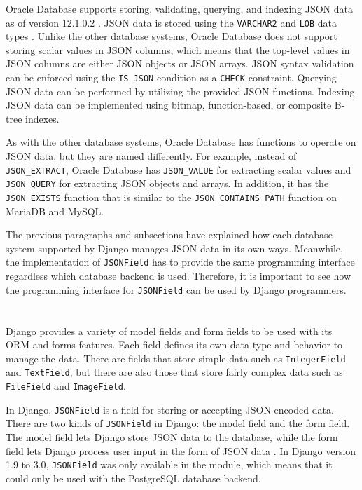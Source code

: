 Oracle Database supports storing, validating, querying, and indexing JSON data
as of version 12.1.0.2 \cite{oracle:12.1.0.2}. JSON data is stored using the
\verb|VARCHAR2| and \verb|LOB| data types \cite{oracle:json}. Unlike the other
database systems, Oracle Database does not support storing scalar values in
JSON columns, which means that the top-level values in JSON columns are either
JSON objects or JSON arrays. JSON syntax validation can be enforced using the
\verb|IS JSON| condition as a \verb|CHECK| constraint. Querying JSON data can
be performed by utilizing the provided JSON functions. Indexing JSON data can
be implemented using bitmap, function-based, or composite B-tree indexes.

As with the other database systems, Oracle Database has functions to operate on
JSON data, but they are named differently. For example, instead of
\verb|JSON_EXTRACT|, Oracle Database has \verb|JSON_VALUE| for extracting
scalar values and \verb|JSON_QUERY| for extracting JSON objects and arrays. In
addition, it has the \verb|JSON_EXISTS| function that is similar to the
\verb|JSON_CONTAINS_PATH| function on MariaDB and MySQL.

The previous paragraphs and subsections have explained how each database
system supported by Django manages JSON data in its own ways. Meanwhile, the
implementation of \verb|JSONField| has to provide the same programming
interface regardless which database backend is used. Therefore, it is important
to see how the programming interface for \verb|JSONField| can be used by Django
programmers.

\section{}

Django provides a variety of model fields and form fields to be used with its
ORM and forms features. Each field defines its own data type and behavior to
manage the data. There are fields that store simple data such as
\verb|IntegerField| and \verb|TextField|, but there are also those that store
fairly complex data such as \verb|FileField| and \verb|ImageField|.

In Django, \verb|JSONField| is a field for storing or accepting JSON-encoded
data. There are two kinds of \verb|JSONField| in Django: the model field and
the form field. The model field lets Django store JSON data to the database,
while the form field lets Django process user input in the form of JSON data
\cite{django30_modeljsonfield, django30_formjsonfield}. In Django version
1.9 to 3.0, \verb|JSONField| was only available in the
 module, which means that it could only be used
with the PostgreSQL database backend.

